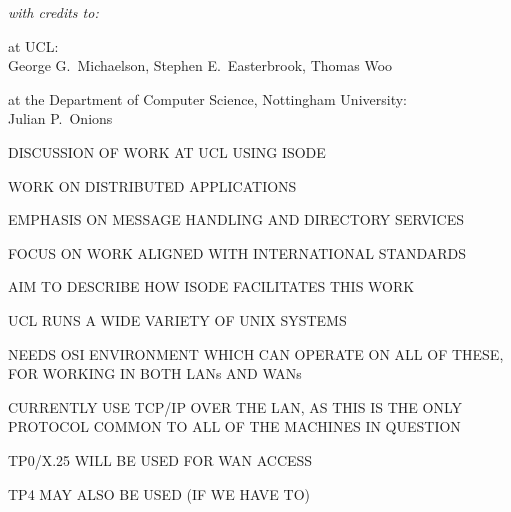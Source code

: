 \begin{note}\em
with credits to:

\begin{nrtc}
\item	at UCL:\\
	George G.~Michaelson, Stephen E.~Easterbrook, Thomas Woo

\item	at the Department of Computer Science, Nottingham University:\\
	Julian P.~Onions
\end{nrtc}
\end{note}


\begin{bwslide}

\begin{nrtc}
\item	DISCUSSION OF WORK AT UCL USING ISODE

\item	WORK ON DISTRIBUTED APPLICATIONS

\item	EMPHASIS ON MESSAGE HANDLING AND DIRECTORY SERVICES

\item	FOCUS ON WORK ALIGNED WITH INTERNATIONAL STANDARDS

\item	AIM TO DESCRIBE HOW ISODE FACILITATES THIS WORK
\end{nrtc}
\end{bwslide}


\begin{bwslide}

\begin{nrtc}
\item	UCL RUNS A WIDE VARIETY OF UNIX SYSTEMS

\item	NEEDS OSI ENVIRONMENT WHICH CAN OPERATE ON ALL OF THESE,
	FOR WORKING IN BOTH LANs AND WANs

\item	CURRENTLY USE TCP/IP OVER THE LAN,
	AS THIS IS THE ONLY PROTOCOL COMMON TO ALL OF THE MACHINES IN QUESTION

\item	TP0/X.25 WILL BE USED FOR WAN ACCESS

\item	TP4 MAY ALSO BE USED (IF WE HAVE TO)
\end{nrtc}
\end{bwslide}


